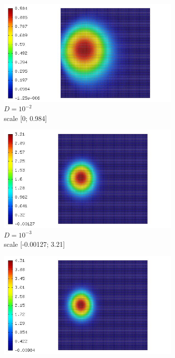 \documentclass[mathserif]{beamer}
\begin{document}
\begin{frame}
\begin{figure}[H]
\begin{subfigure}[H]{0.02\textwidth}
	\end{subfigure}
	\begin{subfigure}[H]{0.3\textwidth}
	\centering
		\includegraphics[width=.9\textwidth, trim = 65mm 0mm 0mm 0mm, clip]{images/timedep-multiscale/stability/eps=001_804.jpg}
		\vspace{-3mm}
		\caption{$D = 10^{-2}$\\\vspace{-2mm}scale [0; 0.984]}
	\end{subfigure}
	\begin{subfigure}[H]{0.3\textwidth}
	\centering
		\includegraphics[width=.9\textwidth, trim = 65mm 0mm 0mm 0mm, clip]{images/timedep-multiscale/stability/eps=0001_804.jpg}
		\vspace{-3mm}
		\caption{$D = 10^{-3}$\\\vspace{-2mm}scale [-0.00127; 3.21]}
	\end{subfigure}
	\begin{subfigure}[H]{0.3\textwidth}
	\centering
		\includegraphics[width=.9\textwidth, trim = 65mm 0mm 0mm 0mm, clip]{images/timedep-multiscale/stability/eps=0_804.jpg}

\end{subfigure}
\end{figure}
\end{frame}
\end{document}
